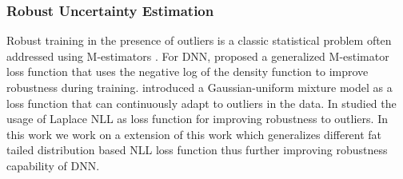 \documentclass[letterpaper, 10 pt, conference]{ieeeconf}  %
\begin{document}
\subsubsection*{{\textbf{Robust Uncertainty Estimation}}}
Robust training in the presence of outliers is a classic statistical problem often addressed using M-estimators \cite{huber2004robust}. For DNN, \cite{barron2019general} proposed a generalized M-estimator loss function that uses the negative log of the density function to improve robustness during training. \cite{lathuiliere2018deepgum} introduced a Gaussian-uniform mixture model as a loss function that can continuously adapt to outliers in the data. In \cite{nair_laplace_2O22} studied the usage of Laplace NLL as loss function for improving robustness to outliers. 
In this work we work on a extension of this work which generalizes different fat tailed distribution based NLL loss function thus further improving robustness capability of DNN.
\end{document}
